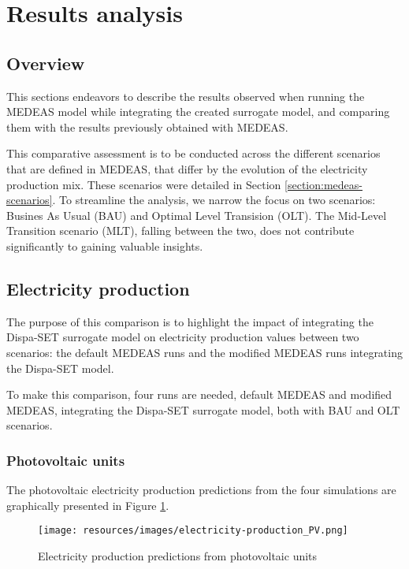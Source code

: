 \section{Results analysis}

\subsection{Overview}

This sections endeavors to describe the results observed when running the MEDEAS model while integrating the created surrogate model, and comparing them with the results previously obtained with MEDEAS.

This comparative assessment is to be conducted across the different scenarios that are defined in MEDEAS, that differ by the evolution of the electricity production mix. These scenarios were detailed in Section \ref{section:medeas-scenarios}. To streamline the analysis, we narrow the focus on two scenarios: Busines As Usual (BAU) and Optimal Level Transision (OLT). The Mid-Level Transition scenario (MLT), falling between the two, does not contribute significantly to gaining valuable insights.

\subsection{Electricity production}

The purpose of this comparison is to highlight the impact of integrating the Dispa-SET surrogate model on electricity production values between two scenarios: the default MEDEAS runs and the modified MEDEAS runs integrating the Dispa-SET model.

To make this comparison, four runs are needed, default MEDEAS and modified MEDEAS, integrating the Dispa-SET surrogate model, both with BAU and OLT scenarios.

\subsubsection{Photovoltaic units}

The photovoltaic electricity production predictions from the four simulations are graphically presented in Figure \ref{fig:electricity-production-PV}.

\begin{figure}[h]
    \centering
    \texttt{[image: resources/images/electricity-production\_PV.png]}
    \caption{Electricity production predictions from photovoltaic units}
    \label{fig:electricity-production-PV}
\end{figure}

